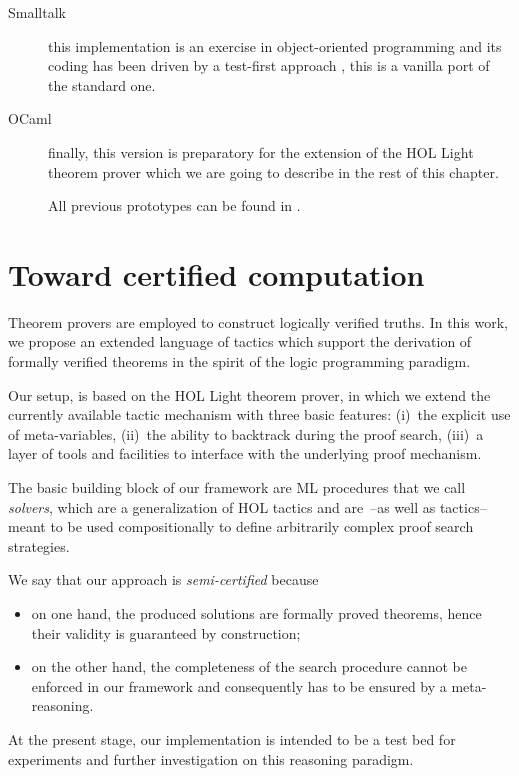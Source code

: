 \begin{description}
\item[Smalltalk] this implementation is an exercise in object-oriented
programming and its coding has been driven by a test-first approach
\citep{beck:TDD}, this is a vanilla port of the standard one.

\item[OCaml] finally, this version is preparatory for the extension of the HOL
Light theorem prover which we are going to describe in the rest of this
chapter.

All previous prototypes can be found in \citep{Nocentini:kanrens}.

\end{description}

\section{Toward certified computation}
\label{sec:introduction}

Theorem provers are employed to construct logically verified truths.
In this work, we propose an extended language of tactics which support
the derivation of formally verified theorems in the spirit of the
logic programming paradigm.

Our setup, is based on the HOL Light theorem prover, in which we
extend the currently available tactic mechanism with three basic
features: (i)~the explicit use of meta-variables, (ii)~the ability to
backtrack during the proof search, (iii)~a layer of tools and
facilities to interface with the underlying proof mechanism.

The basic building block of our framework are ML procedures that we
call \emph{solvers}, which are a generalization of HOL tactics and
are~--as well as tactics-- meant to be used compositionally to define
arbitrarily complex proof search strategies.

We say that our approach is \emph{semi-certified} because
\begin{itemize}
\item on one hand, the produced solutions are formally proved
  theorems, hence their validity is guaranteed by construction;
\item on the other hand, the completeness of the search procedure
  cannot be enforced in our framework and consequently has to be
  ensured by a meta-reasoning.
\end{itemize}

At the present stage, our implementation \citep{Maggesi:Nocentini:kanrenlight}
is intended to be a test bed for experiments and further investigation on this
reasoning paradigm.


